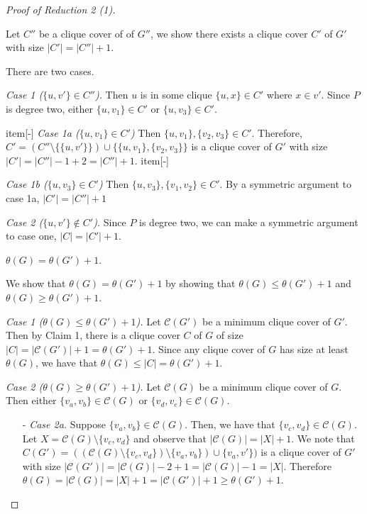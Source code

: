 \documentclass[../techreport.tex]{subfiles}
\begin{document}
\begin{proof}[Proof of Reduction 2 (1)]
	\begin{claim} 
		Let $C''$ be a clique cover of of $G''$, we show there exists a clique cover $C'$ of $G'$ with size $|C'| = |C''| + 1$.
	\end{claim}
	There are two cases.

	\noindent\emph{Case 1 ($\{u, v'\} \in C''$).} Then $u$ is in some clique $\{u, x\} \in C'$ where $x \in v'$. Since $P$ is degree two, either $\{u, v_1\} \in C'$ or $\{u, v_3\} \in C'$.
	\begin{itemize}
		item[-] \emph{Case 1a ($\{u, v_1\} \in C'$)} Then $\{u, v_1\}, \{v_2, v_3\} \in C'$. Therefore, $C' = (C'' \setminus \{\{u, v'\}\}) \cup \{\{u, v_1\}, \{v_2, v_3\}\}$ is a clique cover of $G'$ with size $|C'| = |C''| - 1 + 2 = |C''| + 1$.
		item[-]
	\end{itemize} \emph{Case 1b ($\{u, v_3\} \in C'$)} Then $\{u, v_3\}, \{v_1, v_2\} \in C'$. By a symmetric argument to case 1a, $|C'| = |C''| + 1$

	\noindent\emph{Case 2 ($\{u, v'\} \notin C'$).} Since $P$ is degree two, we can make a symmetric argument to case one, $|C| = |C'| + 1$.

	\begin{claim}
		$\theta(G) = \theta(G') + 1$.
	\end{claim}
	We show that $\theta(G) = \theta(G') + 1$ by showing that $\theta(G) \leq \theta(G') + 1$ and $\theta(G) \geq \theta(G') + 1$.

	\noindent\emph{Case 1 ($\theta(G) \leq \theta(G') + 1$).} Let $\mathcal{C}(G')$ be a minimum clique cover of $G'$. Then by Claim 1, there is a clique cover $C$ of $G$ of size $|C| = |\mathcal{C}(G')| + 1 = \theta(G') + 1$. Since any clique cover of $G$ has size at least $\theta(G)$, we have that $\theta(G) \leq |C| = \theta(G') + 1$. 

	\noindent\emph{Case 2 ($\theta(G) \geq \theta(G') + 1$).} Let $\mathcal{C}(G)$ be a minimum clique cover of $G$. Then either $\{v_a, v_b\} \in \mathcal{C}(G)$ or $\{v_d, v_e\} \in \mathcal{C}(G)$.
	\begin{itemize}
		\item[-]\emph{Case 2a.} Suppose $\{v_a, v_b\} \in \mathcal{C}(G)$. Then, we have that $\{v_c, v_d\} \in \mathcal{C}(G)$. Let $X = \mathcal{C}(G) \setminus \{v_c, v_d\}$ and observe that $|\mathcal{C}(G)| = |X| + 1$. We note that $C(G') = ((\mathcal{C}(G) \setminus \{v_c, v_d\}) \setminus \{v_a, v_b\}) \cup \{v_a, v'\})$ is a clique cover of $G'$ with size $|\mathcal{C}(G')| = |\mathcal{C}(G)| - 2 + 1 = |\mathcal{C}(G)| - 1 = |X|$. Therefore $\theta(G) = |\mathcal{C}(G)| = |X| + 1 = |\mathcal{C}(G')| + 1 \geq \theta(G') + 1$.


\end{itemize}
\end{proof}
\end{document}
